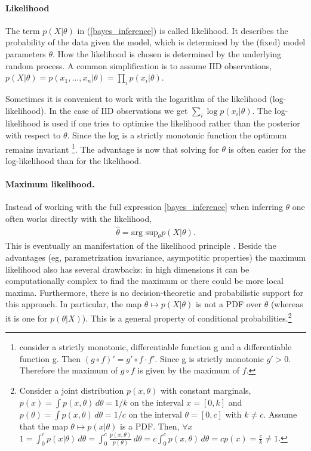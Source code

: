 \paragraph*{Likelihood}
The term $p(X|\theta)$  in  (\ref{bayes_inference}) is called likelihood. It describes the probability of the data given the model, which is determined by the (fixed) model parameters $\theta$. How the likelihood is chosen is determined by the underlying random process. A common simplification is to assume IID observations, $p(X|\theta) = p(x_1, \dots, x_n|\theta) =   \prod _i  p(x_i | \theta)$. 

Sometimes it is convenient to work with the logarithm of the likelihood (log-likelihood). In the case of IID observations we get $\sum _i \log p(x_i | \theta)$. The log-likelihood is used if one tries to optimise the likelihood rather than the posterior with respect to $\theta$. Since the log is a strictly monotonic function the optimum remains invariant \footnote{consider a strictly monotonic, differentiable function g and a differentiable function g. Then $(g \circ f) '  = g'\circ f \cdot f'$. Since g is strictly monotonic $g' >0 $. Therefore the maximum of  $g \circ f$ is given by the maximum of $f$.}. The advantage is now that solving for $\theta$ is often easier for the log-likelihood than for the likelihood. 

\paragraph*{Maximum likelihood.} Instead of working with the full expression \ref{bayes_inference} when inferring $\theta$ one often works directly with the likelihood,
\begin{align}
\hat \theta = \text{arg sup}_\theta p(X|\theta).
\end{align}
This is eventually an manifestation of the likelihood principle \cite{robert}. Beside the advantages (eg, parametrization invariance, asympotitic properties) the maximum likelihood also has several drawbacks: in high dimensions it can be computationally complex to find the maximum or there could be more local maxima. Furthermore, there is no decision-theoretic and probabilistic support for this approach. In particular,  the map $\theta \mapsto p(X|\theta)$ is not a PDF over $\theta$ (whereas it is one for $p(\theta|X)$). This is a general property of conditional probabilities.\footnote{Consider 
a joint distribution $p(x, \theta)$ with constant marginals, $p(x) = \int p(x,\theta)\, d \theta =1/k$ on the interval $x = [0,k]$ and  $p(\theta) = \int p(x,\theta)\, d \theta =1/c$  on the interval $\theta = [0,c]$ with $k\neq c$.  Assume that the map $\theta \mapsto p(x|\theta)$ is a PDF. Then, $\forall x$  $1=\int_0^c p(x|\theta) \, d \theta = \int_0^c\frac{p(x,\theta)}{p(\theta)}\, d\theta =  c \int_0^cp(x,\theta)\, d\theta = c p(x) = \frac{c}{k} \neq 1$.}


